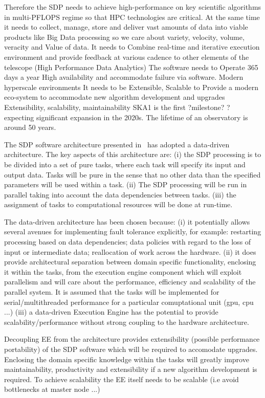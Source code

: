 \documentclass[11pt,a4paper]{article}
\begin{document}
Therefore the SDP needs to achieve high-performance on key scientific algorithms in multi-PFLOPS regime so that HPC technologies are critical.
At the same time it needs to collect, manage, store and deliver vast amounts of data into viable products like Big Data processing so we care about variety, velocity, volume, veracity and Value of data. 
It needs to Combine real-time and iterative execution environment and provide feedback at various cadence to other elements of the telescope
(High Performance Data Analytics)
The software needs to Operate 365 days a year High availability and accommodate failure via software. Modern hyperscale environments
It needs to be Extensible, Scalable to Provide a modern eco-system to accommodate new algorithm development and upgrades
Extensibility, scalability, maintainability
SKA1 is the first ?milestone? ? expecting significant expansion in the 2020s. The lifetime of an observatory is around 50 years. 

The SDP software architecture presented in~\cite{SDParch} has adopted a data-driven architecture. The key aspects of this architecture 
are: (i) the SDP processing is to be divided into a set of pure tasks, where each task will specify its input and output data. 
Tasks will be pure in the sense that no other data than the specified parameters will be used within a task. (ii) The SDP processing 
will be run in parallel taking into account the data dependencies between tasks. (iii) the assignment of tasks to computational resources will be done
at run-time. 

The data-driven architecture has been chosen because: (i) it potentially allows several avenues for implementing fault tolerance explicitly, for example: restarting processing based on data dependencies; data policies with regard to the loss of input or intermediate data; reallocation of work across the hardware. (ii) it does provide architectural separation between domain specific functionality, enclosing
it within the tasks, from the execution engine component which will exploit parallelism and will care about the performance,
efficiency and scalability of the parallel system. It is assumed that the tasks will be implemented for serial/multithreaded performance for a 
particular comuptational unit (gpu, cpu ...) (iii) a data-driven Execution Engine has the potential to provide scalability/performance without strong coupling
to the hardware architecture.

Decoupling EE from the architecture provides extensibility (possible performance portability) of the SDP software which will be required to accomodate upgrades. Enclosing the domain specific knowledge within the tasks will greatly improve maintainability, productivity and extensibility if a new algorithm development is required. To achieve scalability the EE itself needs to be scalable (i.e avoid bottlenecks at master node ...)
\end{document}
